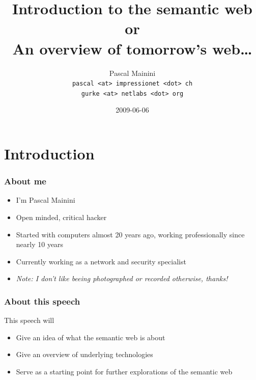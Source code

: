 \documentclass[handout]{beamer}
\title{Introduction to the semantic web \\ 
or \\
An overview of tomorrow's web\ldots}
\author{
Pascal Mainini\\
\texttt{pascal <at> impressionet <dot> ch}\\
\texttt{gurke <at> netlabs <dot> org}\\
}
\date{2009-06-06}
\begin{document}
    \begin{frame}
        \titlepage
    \end{frame}

    \section{Introduction}

        \begin{frame}
            \frametitle{About me}

            \begin{itemize}
                \item I'm Pascal Mainini
                \pause
                \item Open minded, critical hacker
                \pause
                \item Started with computers almost 20 years ago, working professionally since nearly 10 years
                \pause
                \item Currently working as a network and security specialist
                \pause
                \item \textit{Note: I don't like beeing photographed or recorded otherwise, thanks!}
            \end{itemize}
        \end{frame}

        \begin{frame}
            \frametitle{About this speech}

            This speech will
            \vskip 0.7cm
            \pause

            \begin{itemize}
                \item Give an idea of what the semantic web is about
                \pause
                \item Give an overview of underlying technologies
                \pause
                \item Serve as a starting point for further explorations of the semantic web
            \end{itemize}
        \end{frame}
\end{document}
